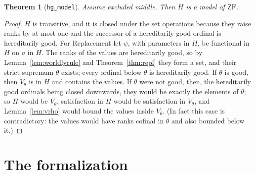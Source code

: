 \documentclass[10pt]{article}
\newtheorem{theorem}{Theorem}[section]
\theoremstyle{definition}
\theoremstyle{remark}
\newcommand{\ZF}{\mathrm{ZF}}
\newcommand{\lean}[1]{\texttt{#1}}
\begin{document}
\begin{theorem}[\lean{hg\_model}]
Assume excluded middle. Then $H$ is a model of $\ZF$.
\end{theorem}
\begin{proof}
$H$ is transitive, and it is closed under the set operations because
they raise ranks by at most one and the successor of a hereditarily good
ordinal is hereditarily good. For Replacement let $\psi$, with parameters
in $H$, be functional in $H$ on $a$ in $H$. The ranks of the values are
hereditarily good, so by Lemma~\ref{lem:worldlyrule} and
Theorem~\ref{thm:repl} they form a set, and their strict supremum $\theta$
exists; every ordinal below $\theta$ is hereditarily good. If $\theta$ is good,
then $V_\theta$ is in $H$ and contains the values. If $\theta$ were not good,
then, the hereditarily good ordinals being closed downwards, they would
be exactly the elements of $\theta$; so $H$ would be $V_\theta$, satisfaction in
$H$ would be satisfaction in $V_\theta$, and Lemma~\ref{lem:vrho} would
bound the values inside $V_\theta$. (In fact this case is contradictory: the
values would have ranks cofinal in $\theta$ and also bounded below it.)
\end{proof}
\section{The formalization}\label{sec:lean}
\end{document}
